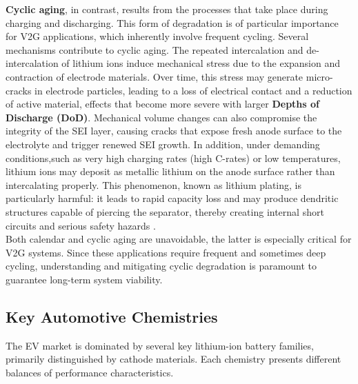 \textbf{Cyclic aging}, in contrast, results from the processes that take place during charging and discharging. This form of degradation is of particular importance for V2G applications, which inherently involve frequent cycling. Several mechanisms contribute to cyclic aging. The repeated intercalation and de-intercalation of lithium ions induce mechanical stress due to the expansion and contraction of electrode materials. Over time, this stress may generate micro-cracks in electrode particles, leading to a loss of electrical contact and a reduction of active material, effects that become more severe with larger \textbf{Depths of Discharge (DoD)}. Mechanical volume changes can also compromise the integrity of the SEI layer, causing cracks that expose fresh anode surface to the electrolyte and trigger renewed SEI growth. In addition, under demanding conditions,such as very high charging rates (high C-rates) or low temperatures, lithium ions may deposit as metallic lithium on the anode surface rather than intercalating properly. This phenomenon, known as lithium plating, is particularly harmful: it leads to rapid capacity loss and may produce dendritic structures capable of piercing the separator, thereby creating internal short circuits and serious safety hazards \cite{birkl2017degradation}.
\noindent   
\\
Both calendar and cyclic aging are unavoidable, the latter is especially critical for V2G systems. Since these applications require frequent and sometimes deep cycling, understanding and mitigating cyclic degradation is paramount to guarantee long-term system viability.


\subsection{Key Automotive Chemistries}

The EV market is dominated by several key lithium-ion battery families, primarily distinguished by cathode materials. Each chemistry presents different balances of performance characteristics.

